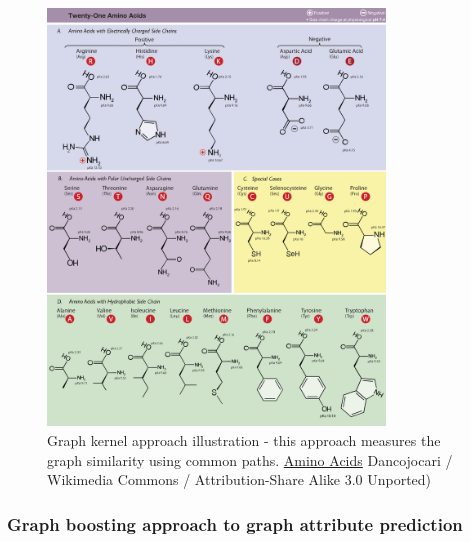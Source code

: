 \documentclass{article}
\begin{document}
\begin{landscape}
\begin{figure}[H]\centering
	\includegraphics[width=0.8\textwidth]{AminoAcids}
	\caption{
		Graph kernel approach illustration - this approach measures the graph similarity using common paths.
		\href{https://commons.wikimedia.org/wiki/File:Amino_Acids.svg}
		{Amino Acids}
		Dancojocari / Wikimedia Commons / Attribution-Share Alike 3.0 Unported)
	}
	\label{fig:AminoAcids}
\end{figure}

\subsubsection{Graph boosting approach to graph attribute prediction}


\end{landscape}
\end{document}
